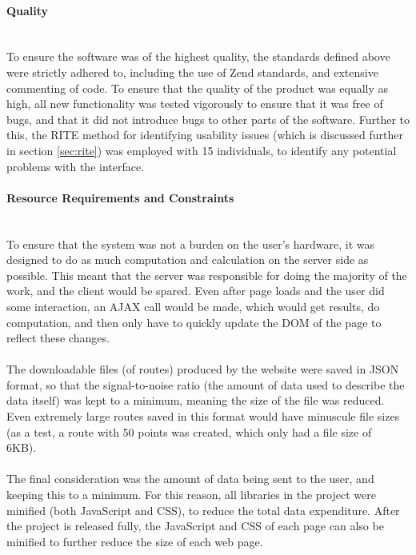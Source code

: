 \paragraph{Quality}\ \\
To ensure the software was of the highest quality, the standards defined above were strictly adhered to, including the use of Zend standards, and extensive commenting of code. To ensure that the quality of the product was equally as high, all new functionality was tested vigorously to ensure that it was free of bugs, and that it did not introduce bugs to other parts of the software. Further to this, the RITE method for identifying usability issues (which is discussed further in section \ref{sec:rite}) was employed with 15 individuals, to identify any potential problems with the interface. 

\paragraph{Resource Requirements and Constraints}\ \\
To ensure that the system was not a burden on the user's hardware, it was designed to do as much computation and calculation on the server side as possible. This meant that the server was responsible for doing the majority of the work, and the client would be spared. Even after page loads and the user did some interaction, an AJAX call would be made, which would get results, do computation, and then only have to quickly update the DOM of the page to reflect these changes.\ \\
\ \\
The downloadable files (of routes) produced by the website were saved in JSON format, so that the signal-to-noise ratio (the amount of data used to describe the data itself) was kept to a minimum, meaning the size of the file was reduced. Even extremely large routes saved in this format would have minuscule file sizes (as a test, a route with 50 points was created, which only had a file size of 6KB).\ \\
\ \\
The final consideration was the amount of data being sent to the user, and keeping this to a minimum. For this reason, all libraries in the project were minified (both JavaScript and CSS), to reduce the total data expenditure. After the project is released fully, the JavaScript and CSS of each page can also be minified to further reduce the size of each web page. 

